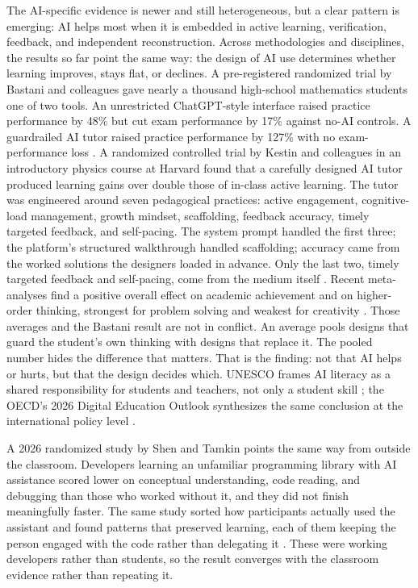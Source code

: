 \documentclass{SIAMbook2023}
\begin{document}
The AI-specific evidence is newer and still heterogeneous, but a clear pattern is emerging: AI helps most when it is embedded in active learning, verification, feedback, and independent reconstruction. Across methodologies and disciplines, the results so far point the same way: the design of AI use determines whether learning improves, stays flat, or declines. A pre-registered randomized trial by Bastani and colleagues gave nearly a thousand high-school mathematics students one of two tools. An unrestricted ChatGPT-style interface raised practice performance by 48\% but cut exam performance by 17\% against no-AI controls. A guardrailed AI tutor raised practice performance by 127\% with no exam-performance loss \citep{bastani2025generative}. A randomized controlled trial by Kestin and colleagues in an introductory physics course at Harvard found that a carefully designed AI tutor produced learning gains over double those of in-class active learning. The tutor was engineered around seven pedagogical practices: active engagement, cognitive-load management, growth mindset, scaffolding, feedback accuracy, timely targeted feedback, and self-pacing. The system prompt handled the first three; the platform's structured walkthrough handled scaffolding; accuracy came from the worked solutions the designers loaded in advance. Only the last two, timely targeted feedback and self-pacing, come from the medium itself \citep{kestin2025ai}. Recent meta-analyses find a positive overall effect on academic achievement \citep{sun2024does} and on higher-order thinking, strongest for problem solving and weakest for creativity \citep{zhao2025does}. Those averages and the Bastani result are not in conflict. An average pools designs that guard the student's own thinking with designs that replace it. The pooled number hides the difference that matters. That is the finding: not that AI helps or hurts, but that the design decides which. UNESCO frames AI literacy as a shared responsibility for students and teachers, not only a student skill \citep{miao2024aia,miao2024aib}; the OECD's 2026 Digital Education Outlook synthesizes the same conclusion at the international policy level \citep{oecd2026digital}.

A 2026 randomized study by Shen and Tamkin points the same way from outside the classroom. Developers learning an unfamiliar programming library with AI assistance scored lower on conceptual understanding, code reading, and debugging than those who worked without it, and they did not finish meaningfully faster. The same study sorted how participants actually used the assistant and found patterns that preserved learning, each of them keeping the person engaged with the code rather than delegating it \citep{shen2026skill}. These were working developers rather than students, so the result converges with the classroom evidence rather than repeating it.
\end{document}
